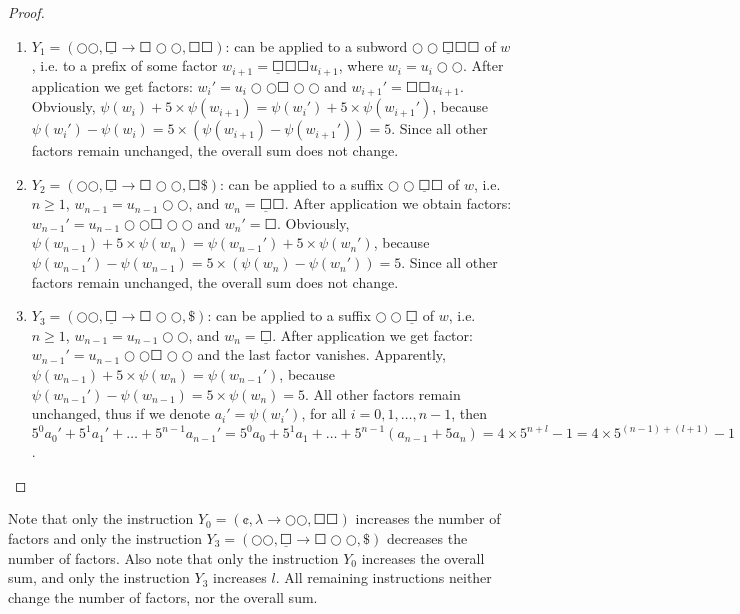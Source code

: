 \begin{proof}
\begin{enumerate}
\item $Y_1 = (\Circle \Circle, \underline{\Square} \to \Square \Circle \Circle, \Square \Square)$: can be applied to a subword $\Circle \Circle \underline{\Square} \Square \Square$ of $w$, i.e. to a prefix of some factor $w_{i+1} = \underline{\Square} \Square \Square u_{i+1}$, where $w_i = u_i \Circle \Circle$. After application we get factors: $w_i' = u_i \Circle \Circle \Square \Circle \Circle$ and $w_{i+1}' = \Square \Square u_{i+1}$. Obviously, $\psi(w_i) + 5 \times \psi(w_{i+1}) = \psi(w_i') + 5 \times \psi(w_{i+1}')$, because $\psi(w_i') - \psi(w_i) = 5 \times (\psi(w_{i+1}) - \psi(w_{i+1}')) = 5$. Since all other factors remain unchanged, the overall sum does not change.
\item $Y_2 = (\Circle \Circle, \underline{\Square} \to \Square \Circle \Circle, \Square \$)$: can be applied to a suffix $\Circle \Circle \underline{\Square} \Square$ of $w$, i.e. $n \ge 1$, $w_{n-1} = u_{n-1} \Circle \Circle$, and $w_n = \underline{\Square} \Square$. After application we obtain factors: $w_{n-1}' = u_{n-1} \Circle \Circle \Square \Circle \Circle$ and $w_n' = \Square$. Obviously, $\psi(w_{n-1}) + 5 \times \psi(w_n) = \psi(w_{n-1}') + 5 \times \psi(w_n')$, because $\psi(w_{n-1}') - \psi(w_{n-1}) = 5 \times (\psi(w_n) - \psi(w_n')) = 5$. Since all other factors remain unchanged, the overall sum does not change.
\item $Y_3 = (\Circle \Circle, \underline{\Square} \to \Square \Circle \Circle, \$)$: can be applied to a suffix $\Circle \Circle \underline{\Square}$ of $w$, i.e. $n \ge 1$, $w_{n-1} = u_{n-1} \Circle \Circle$, and $w_n = \underline{\Square}$. After application we get factor: $w_{n-1}' = u_{n-1} \Circle \Circle \Square \Circle \Circle$ and the last factor vanishes. Apparently, $\psi(w_{n-1}) + 5 \times \psi(w_n) = \psi(w_{n-1}')$, because $\psi(w_{n-1}') - \psi(w_{n-1}) = 5 \times \psi(w_n) = 5$. All other factors remain unchanged, thus if we denote $a_i' = \psi(w_i')$, for all $i = 0, 1, \ldots, n-1$, then $5^0 a_0' + 5^1 a_1' + \ldots + 5^{n-1} a_{n-1}' = 5^0 a_0 + 5^1 a_1 + \ldots + 5^{n-1} (a_{n-1} + 5a_n) = 4 \times 5^{n+l} - 1 = 4 \times 5^{(n-1)+(l+1)} - 1$.
\end{enumerate}
\end{proof}

Note that only the instruction $Y_0 = (\cent, \lambda \to \Circle \Circle, \Square \Square)$ increases the number of factors and only the instruction $Y_3 = (\Circle \Circle, \underline{\Square} \to \Square \Circle \Circle, \$)$ decreases the number of factors. Also note that only the instruction $Y_0$ increases the overall sum, and only the instruction $Y_3$ increases $l$. All remaining instructions neither change the number of factors, nor the overall sum.

